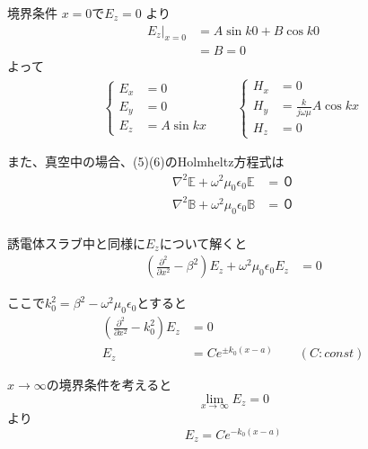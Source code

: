 \documentclass[a4paper,10pt]{bxjsarticle}
\begin{document}
境界条件 $x = 0$で$E_z = 0$ より
\begin{align*}
    E_z|_{x=0} &= A \sin k 0 + B \cos k 0 \\
             &= B = 0 
\end{align*}
よって
\begin{align*}
    \begin{cases}
        E_x &= 0 \\
        E_y &= 0 \\
        E_z &= A \sin k x
    \end{cases} \qquad
    \begin{cases}
        H_x &= 0\\
        H_y &= \frac{k}{j \omega \mu} A \cos kx \\
        H_z &= 0
    \end{cases}
\end{align*}

また、真空中の場合、(5)(6)のHolmheltz方程式は
\begin{align*}
    \nabla^2 \mathbb{E} + \omega^2 \mu_0 \epsilon_0 \mathbb{E} &= ０ \\
    \nabla^2 \mathbb{B} + \omega^2 \mu_0 \epsilon_0 \mathbb{B} &= ０ \\
\end{align*}

誘電体スラブ中と同様に$E_z$について解くと
\begin{align*}
    ( \frac{\partial^2}{\partial x^2} - \beta^2)E_z + \omega^2 \mu_0 \epsilon_0 E_z &= 0
\end{align*}

ここで$k_0^2 = \beta^2 - \omega^2 \mu_0 \epsilon_0$とすると
\begin{align*}
    ( \frac{\partial^2}{\partial x^2} - k_0^2)E_z &= 0 \\
    E_z &= C e^{\pm k_0 (x - a)} \qquad ( C : const)
\end{align*}

$x \rightarrow \infty$の境界条件を考えると
$$ \lim_{x \to \infty} E_z = 0 $$ より
$$ E_z = C e^{- k_0 (x - a)} $$
\end{document}
